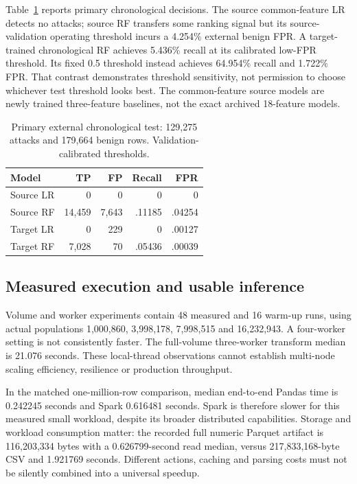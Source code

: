 \documentclass[conference]{IEEEtran}
\begin{document}
Table~\ref{tab:external} reports primary chronological decisions. The source common-feature LR detects no attacks; source RF transfers some ranking signal but its source-validation operating threshold incurs a 4.254\% external benign FPR. A target-trained chronological RF achieves 5.436\% recall at its calibrated low-FPR threshold. Its fixed 0.5 threshold instead achieves 64.954\% recall and 1.722\% FPR. That contrast demonstrates threshold sensitivity, not permission to choose whichever test threshold looks best. The common-feature source models are newly trained three-feature baselines, not the exact archived 18-feature models.

\begin{table}[t]\caption{Primary external chronological test: 129,275 attacks and 179,664 benign rows. Validation-calibrated thresholds.}\label{tab:external}\centering\small
\begin{tabular}{lrrrr}\toprule Model & TP & FP & Recall & FPR\\\midrule Source LR &0&0&0&0\\Source RF&14,459&7,643&.11185&.04254\\Target LR&0&229&0&.00127\\Target RF&7,028&70&.05436&.00039\\\bottomrule\end{tabular}\end{table}

\subsection{Measured execution and usable inference}
Volume and worker experiments contain 48 measured and 16 warm-up runs, using actual populations 1,000,860, 3,998,178, 7,998,515 and 16,232,943. A four-worker setting is not consistently faster. The full-volume three-worker transform median is 21.076 seconds. These local-thread observations cannot establish multi-node scaling efficiency, resilience or production throughput.

In the matched one-million-row comparison, median end-to-end Pandas time is 0.242245 seconds and Spark 0.616481 seconds. Spark is therefore slower for this measured small workload, despite its broader distributed capabilities. Storage and workload consumption matter: the recorded full numeric Parquet artifact is 116,203,334 bytes with a 0.626799-second read median, versus 217,833,168-byte CSV and 1.921769 seconds. Different actions, caching and parsing costs must not be silently combined into a universal speedup.
\end{document}
